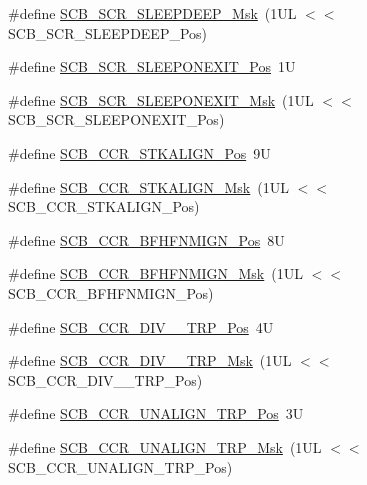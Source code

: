 \begin{DoxyCompactItemize}
\item 
\#define \hyperlink{group___c_m_s_i_s___s_c_b_ga77c06a69c63f4b3f6ec1032e911e18e7}{S\+C\+B\+\_\+\+S\+C\+R\+\_\+\+S\+L\+E\+E\+P\+D\+E\+E\+P\+\_\+\+Msk}~(1\+U\+L $<$$<$ S\+C\+B\+\_\+\+S\+C\+R\+\_\+\+S\+L\+E\+E\+P\+D\+E\+E\+P\+\_\+\+Pos)
\item 
\#define \hyperlink{group___c_m_s_i_s___s_c_b_ga3680a15114d7fdc1e25043b881308fe9}{S\+C\+B\+\_\+\+S\+C\+R\+\_\+\+S\+L\+E\+E\+P\+O\+N\+E\+X\+I\+T\+\_\+\+Pos}~1U
\item 
\#define \hyperlink{group___c_m_s_i_s___s_c_b_ga50a243e317b9a70781b02758d45b05ee}{S\+C\+B\+\_\+\+S\+C\+R\+\_\+\+S\+L\+E\+E\+P\+O\+N\+E\+X\+I\+T\+\_\+\+Msk}~(1\+U\+L $<$$<$ S\+C\+B\+\_\+\+S\+C\+R\+\_\+\+S\+L\+E\+E\+P\+O\+N\+E\+X\+I\+T\+\_\+\+Pos)
\item 
\#define \hyperlink{group___c_m_s_i_s___s_c_b_gac2d20a250960a432cc74da59d20e2f86}{S\+C\+B\+\_\+\+C\+C\+R\+\_\+\+S\+T\+K\+A\+L\+I\+G\+N\+\_\+\+Pos}~9U
\item 
\#define \hyperlink{group___c_m_s_i_s___s_c_b_ga33cf22d3d46af158a03aad25ddea1bcb}{S\+C\+B\+\_\+\+C\+C\+R\+\_\+\+S\+T\+K\+A\+L\+I\+G\+N\+\_\+\+Msk}~(1\+U\+L $<$$<$ S\+C\+B\+\_\+\+C\+C\+R\+\_\+\+S\+T\+K\+A\+L\+I\+G\+N\+\_\+\+Pos)
\item 
\#define \hyperlink{group___c_m_s_i_s___s_c_b_ga4010a4f9e2a745af1b58abe1f791ebbf}{S\+C\+B\+\_\+\+C\+C\+R\+\_\+\+B\+F\+H\+F\+N\+M\+I\+G\+N\+\_\+\+Pos}~8U
\item 
\#define \hyperlink{group___c_m_s_i_s___s_c_b_ga89a28cc31cfc7d52d9d7a8fcc69c7eac}{S\+C\+B\+\_\+\+C\+C\+R\+\_\+\+B\+F\+H\+F\+N\+M\+I\+G\+N\+\_\+\+Msk}~(1\+U\+L $<$$<$ S\+C\+B\+\_\+\+C\+C\+R\+\_\+\+B\+F\+H\+F\+N\+M\+I\+G\+N\+\_\+\+Pos)
\item 
\#define \hyperlink{group___c_m_s_i_s___s_c_b_gac8d512998bb8cd9333fb7627ddf59bba}{S\+C\+B\+\_\+\+C\+C\+R\+\_\+\+D\+I\+V\+\_\+\_\+\+T\+R\+P\+\_\+\+Pos}~4U
\item 
\#define \hyperlink{group___c_m_s_i_s___s_c_b_gabb9aeac71b3abd8586d0297070f61dcb}{S\+C\+B\+\_\+\+C\+C\+R\+\_\+\+D\+I\+V\+\_\+\_\+\+T\+R\+P\+\_\+\+Msk}~(1\+U\+L $<$$<$ S\+C\+B\+\_\+\+C\+C\+R\+\_\+\+D\+I\+V\+\_\+\_\+\+T\+R\+P\+\_\+\+Pos)
\item 
\#define \hyperlink{group___c_m_s_i_s___s_c_b_gac4e4928b864ea10fc24dbbc57d976229}{S\+C\+B\+\_\+\+C\+C\+R\+\_\+\+U\+N\+A\+L\+I\+G\+N\+\_\+\+T\+R\+P\+\_\+\+Pos}~3U
\item 
\#define \hyperlink{group___c_m_s_i_s___s_c_b_ga68c96ad594af70c007923979085c99e0}{S\+C\+B\+\_\+\+C\+C\+R\+\_\+\+U\+N\+A\+L\+I\+G\+N\+\_\+\+T\+R\+P\+\_\+\+Msk}~(1\+U\+L $<$$<$ S\+C\+B\+\_\+\+C\+C\+R\+\_\+\+U\+N\+A\+L\+I\+G\+N\+\_\+\+T\+R\+P\+\_\+\+Pos)

\end{DoxyCompactItemize}
